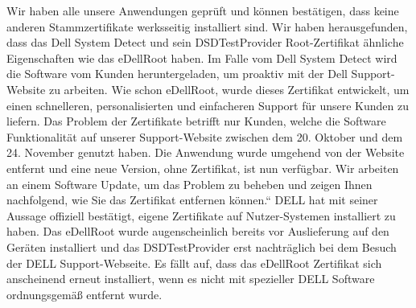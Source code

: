 Wir haben alle unsere Anwendungen geprüft und können bestätigen, dass keine anderen Stammzertifikate werksseitig installiert sind. Wir haben herausgefunden, dass das Dell System Detect und sein DSDTestProvider Root-Zertifikat ähnliche Eigenschaften wie das eDellRoot haben. Im Falle vom Dell System Detect wird die Software vom Kunden heruntergeladen, um proaktiv mit der Dell Support-Website zu arbeiten. Wie schon eDellRoot, wurde dieses Zertifikat entwickelt, um einen schnelleren, personalisierten und einfacheren Support für unsere Kunden zu liefern. Das Problem der Zertifikate betrifft nur Kunden, welche die Software Funktionalität auf unserer Support-Website zwischen dem 20. Oktober und dem 24. November genutzt haben. Die Anwendung wurde umgehend von der Website entfernt und eine neue Version, ohne Zertifikat, ist nun verfügbar. Wir arbeiten an einem Software Update, um das Problem zu beheben und zeigen Ihnen nachfolgend, wie Sie das Zertifikat entfernen können.“\cite{dell}
DELL hat mit seiner Aussage offiziell bestätigt, eigene Zertifikate auf Nutzer-Systemen installiert zu haben. Das eDellRoot wurde augenscheinlich bereits vor Auslieferung auf den Geräten installiert und das DSDTestProvider erst nachträglich bei dem Besuch der DELL Support-Webseite. Es fällt auf, dass das eDellRoot Zertifikat sich anscheinend erneut installiert, wenn es nicht mit spezieller DELL Software ordnungsgemäß entfernt wurde. 